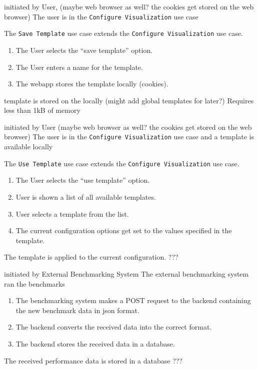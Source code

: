 \bigskip

{initiated by User, (maybe web browser as well? the cookies get stored on the web browser)}
{The user is in the \texttt{Configure Visualization} use case}
{The \texttt{Save Template} use case extends the \texttt{Configure Visualization} use case.
\begin{enumerate}
    \item The User selects the \enquote{save template} option.
    \item The User enters a name for the \gls{template}.
    \item The webapp stores the template locally (cookies).
\end{enumerate}} 
{\Gls{template} is stored on the locally (might add global templates for later?)}
{Requires less than 1kB of memory}

\bigskip

{initiated by User (maybe web browser as well? the cookies get stored on the web browser)}
{The user is in the \texttt{Configure Visualization} use case and a \gls{template} is available locally}
{The \texttt{Use Template} use case extends the \texttt{Configure Visualization} use case.
\begin{enumerate}
    \item The User selects the \enquote{use template} option.
    \item User is shown a list of all available \glspl{template}.
    \item User selects a \gls{template} from the list.
    \item The current \gls{configuration} options get set to the values specified in the template.
\end{enumerate}} 
{The \gls{template} is applied to the current configuration.}
{???}

\bigskip

{initiated by External Benchmarking System}
{The external benchmarking system ran the benchmarks}
{\begin{enumerate}
    \item The benchmarking system makes a POST request to the backend containing the new benchmark data in \acrshort{json} format.
    \item The backend converts the received data into the correct format.
    \item The backend stores the received data in a database.
\end{enumerate}} 
{The received performance data is stored in a database}
{???}


